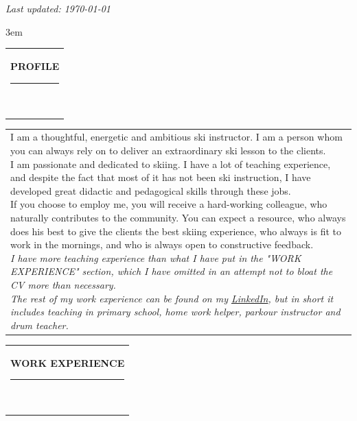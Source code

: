 \documentclass[10pt,A4]{article}
\newcommand{\mpwidth}{\linewidth-\fboxsep-\fboxsep}
\newcommand{\cvtext}[1] {
	\begin{tabular*}{1\mpwidth}{p{1\mpwidth}}
		\parbox{1\mpwidth}{#1}
	\end{tabular*}
}
\newcommand{\cvsection}[1] {
	\vspace{14pt}
	\cvtext{
		\textbf{\huge{\textcolor{darkcol}{\uppercase{#1}}}}\\[-4pt]
		\textcolor{maincol}{ \rule{0.1\textwidth}{2pt} } \\
	}
}
\begin{document}
\begin{paracol}{2}
\begin{rightcolumn}
\textit{Last updated: \today}

\vfill\null
\emergencystretch 3em
\cvsection{PROFILE}
\cvtext{I am a thoughtful, energetic and ambitious ski instructor. 
I am a person whom you can always rely on to deliver an extraordinary ski lesson to the clients.\\

I am passionate and dedicated to skiing. 
I have a lot of teaching experience, and despite the fact that most of it has not been ski instruction,
I have developed great didactic and pedagogical skills through these jobs.\\

If you choose to employ me, you will receive a hard-working colleague,
who naturally contributes to the community. You can expect a resource,
who always does his best to give the clients the best skiing experience,
who always is fit to work in the mornings,
and who is always open to constructive feedback.\\

\textit{I have more teaching experience than what I have put in the "WORK EXPERIENCE" section, which I have omitted in an attempt not to bloat the CV more than necessary.\\
The rest of my work experience can be found on my \href{https://www.linkedin.com/in/lasse-skaalum/}{LinkedIn}, but in short it includes teaching in primary school, home work helper, parkour instructor and drum teacher.}
}

\vfill\null
\cvsection{WORK EXPERIENCE}


\end{rightcolumn}
\end{paracol}
\end{document}

